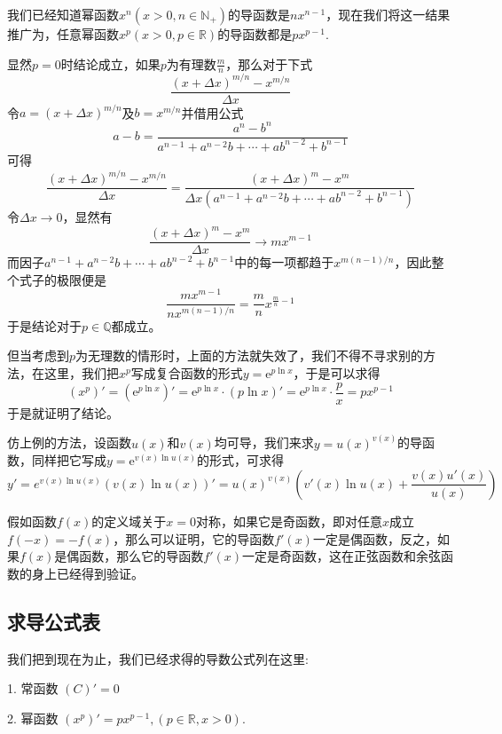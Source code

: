 \begin{example}
  我们已经知道幂函数$x^n(x>0, n \in \mathbb{N}_+)$的导函数是$nx^{n-1}$，现在我们将这一结果推广为，任意幂函数$x^p(x>0, p \in \mathbb{R})$的导函数都是$px^{p-1}$.

  显然$p=0$时结论成立，如果$p$为有理数$\frac{m}{n}$，那么对于下式
  \[ \frac{(x+\Delta x)^{m/n}-x^{m/n}}{\Delta x} \]
  令$a=(x+\Delta x)^{m/n}$及$b=x^{m/n}$并借用公式
  \[ a-b = \frac{a^n-b^n}{a^{n-1}+a^{n-2}b+\cdots+ab^{n-2}+b^{n-1}} \]
  可得
  \[ \frac{(x+\Delta x)^{m/n}-x^{m/n}}{\Delta x} = \frac{(x+\Delta x)^m - x^m}{\Delta x (a^{n-1}+a^{n-2}b+\cdots+ab^{n-2}+b^{n-1})} \]
  令$\Delta x \to 0$，显然有
  \[ \frac{(x+\Delta x)^m - x^m}{\Delta x} \to m x^{m-1} \]
  而因子$a^{n-1}+a^{n-2}b+\cdots+ab^{n-2}+b^{n-1}$中的每一项都趋于$x^{m(n-1)/n}$，因此整个式子的极限便是
  \[ \frac{mx^{m-1}}{nx^{m(n-1)/n}} = \frac{m}{n} x^{\frac{m}{n}-1} \]
  于是结论对于$p \in \mathbb{Q}$都成立。

  但当考虑到$p$为无理数的情形时，上面的方法就失效了，我们不得不寻求别的方法，在这里，我们把$x^p$写成复合函数的形式$y=\mathrm{e}^{p \ln{x}}$，于是可以求得
  \[ (x^p)' = (\mathrm{e}^{p \ln{x}})' = \mathrm{e}^{p \ln{x}} \cdot (p \ln{x})' = \mathrm{e}^{p \ln{x}} \cdot \frac{p}{x} = px^{p-1} \]
  于是就证明了结论。
\end{example}

\begin{example}
  仿上例的方法，设函数$u(x)$和$v(x)$均可导，我们来求$y=u(x)^{v(x)}$的导函数，同样把它写成$y=\mathrm{e}^{v(x) \ln{u(x)}}$的形式，可求得
  \[ y'=e^{v(x) \ln{u(x)}} (v(x) \ln{u(x)})' = u(x)^{v(x)} (v'(x)\ln{u(x)}+\frac{v(x)u'(x)}{u(x)}) \]
\end{example}

\begin{example}
  假如函数$f(x)$的定义域关于$x=0$对称，如果它是奇函数，即对任意$x$成立$f(-x)=-f(x)$，那么可以证明，它的导函数$f'(x)$一定是偶函数，反之，如果$f(x)$是偶函数，那么它的导函数$f'(x)$一定是奇函数，这在正弦函数和余弦函数的身上已经得到验证。
\end{example}

\subsection{求导公式表}
\label{sec:table-of-derivative-formule}

我们把到现在为止，我们已经求得的导数公式列在这里:

1. 常函数 $(C)' = 0$

2. 幂函数 $(x^p)' = p x^{p-1}, (p \in \mathbb{R},x>0)$.

